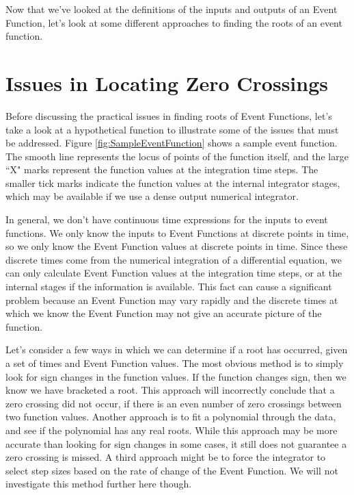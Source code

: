 Now that we've looked at the definitions of the inputs and outputs
of an Event Function, let's look at some different approaches to
finding the roots of an event function.


\section{Issues in Locating Zero Crossings}

Before discussing the practical issues in finding roots of Event
Functions, let's take a look at a hypothetical function to
illustrate some of the issues that must be addressed. Figure
\ref{fig:SampleEventFunction} shows a sample event function.  The
smooth line represents the locus of points of the function itself,
and the large ``X" marks represent the function values at the
integration time steps.  The smaller tick marks indicate the
function values at the internal integrator stages, which may be
available if we use a dense output numerical integrator.

In general, we don't have continuous time expressions for the inputs
to event functions.  We only know the inputs to Event Functions at
discrete points in time, so we only know the Event Function values
at discrete points in time.  Since these discrete times come from
the numerical integration of a differential equation, we can only
calculate Event Function values at the integration time steps, or at
the internal stages if the information is available.  This fact can
cause a significant problem because an Event Function may vary
rapidly and the discrete times at which we know the Event Function
may not give an accurate picture of the function.

Let's consider a few ways in which we can determine if a root has
occurred, given a set of times and Event Function values.  The most
obvious method is to simply look for sign changes in the function
values. If the function changes sign, then we know we have bracketed
a root. This approach will incorrectly conclude that a zero crossing
did not occur, if there is an even number of zero crossings between
two function values.  Another approach is to fit a polynomial
through the data, and see if the polynomial has any real roots.
While this approach may be more accurate than looking for sign
changes in some cases, it still does not guarantee a zero crossing
is missed. A third approach might be to force the integrator to
select step sizes based on the rate of change of the Event Function.
We will not investigate this method further here though.

